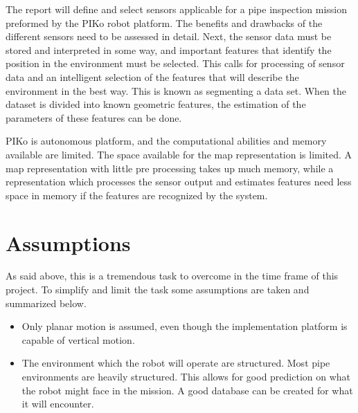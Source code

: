 The report will define and select sensors applicable for a pipe inspection mission
preformed by the PIKo robot platform. The benefits and drawbacks of the different sensors
need to be assessed in detail. Next, the sensor data must be stored and interpreted in some
way, and important features that identify the position in the environment must be selected. 
This calls for processing of sensor data and an intelligent selection of the features that
will describe the environment in the best way. This is known as segmenting a data set.
When the dataset is divided into known geometric features, the estimation of the
parameters of these features can be done. 

PIKo is autonomous platform, and the computational abilities and memory available
are limited. The space available for the map representation is limited.
A map representation with little pre processing takes up much memory, while a
representation which processes the sensor output and estimates features need less space in
memory if the features are recognized by the system. 


\section{Assumptions}
As said above, this is a tremendous task to overcome in the time frame of this project. To
simplify and limit the task some assumptions are taken and summarized below. 
\begin{itemize}
    \item Only planar motion is assumed, even though the implementation platform is
    capable of vertical motion. 
    \item The environment which the robot will operate are structured. Most pipe
    environments are heavily structured. This allows for good prediction on what the robot
    might face in the mission. A good database can be created for what it will encounter. 
\end{itemize}

